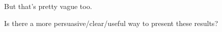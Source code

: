\documentclass[pdflatex,landscape,titlepage]{foils}
\begin{document}
But that's pretty vague too.

Is there a more persuasive/clear/useful way to present these results?


\foilhead[-0.75in]{}
\bgclear
{}
\end{document}
